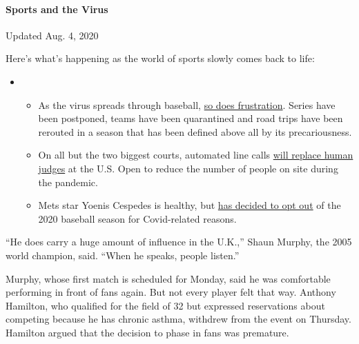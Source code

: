 \hypertarget{sports-and-the-virus}{%
\paragraph{Sports and the Virus}\label{sports-and-the-virus}}

Updated Aug. 4, 2020

Here's what's happening as the world of sports slowly comes back to
life:

\begin{itemize}
\item
  \begin{itemize}
  \tightlist
  \item
    As the virus spreads through baseball,
    \href{https://www.nytimes3xbfgragh.onion/2020/08/03/sports/baseball/mlb-coronavirus-outbreak.html?action=click\&pgtype=Article\&state=default\&region=MAIN_CONTENT_2\&context=storylines_keepup}{so
    does frustration}. Series have been postponed, teams have been
    quarantined and road trips have been rerouted in a season that has
    been defined above all by its precariousness.
  \item
    On all but the two biggest courts, automated line calls
    \href{https://www.nytimes3xbfgragh.onion/2020/08/03/sports/tennis/us-open-hawkeye-line-judges.html?action=click\&pgtype=Article\&state=default\&region=MAIN_CONTENT_2\&context=storylines_keepup}{will
    replace human judges} at the U.S. Open to reduce the number of
    people on site during the pandemic.
  \item
    Mets star Yoenis Cespedes is healthy, but
    \href{https://www.nytimes3xbfgragh.onion/2020/08/02/sports/baseball/Yoenis-cespedes-opt-out-rule.html?action=click\&pgtype=Article\&state=default\&region=MAIN_CONTENT_2\&context=storylines_keepup}{has
    decided to opt out} of the 2020 baseball season for Covid-related
    reasons.
  \end{itemize}
\end{itemize}

``He does carry a huge amount of influence in the U.K.,'' Shaun Murphy,
the 2005 world champion, said. ``When he speaks, people listen.''

Murphy, whose first match is scheduled for Monday, said he was
comfortable performing in front of fans again. But not every player felt
that way. Anthony Hamilton, who qualified for the field of 32 but
expressed reservations about competing because he has chronic asthma,
withdrew from the event on Thursday. Hamilton argued that the decision
to phase in fans was premature.

